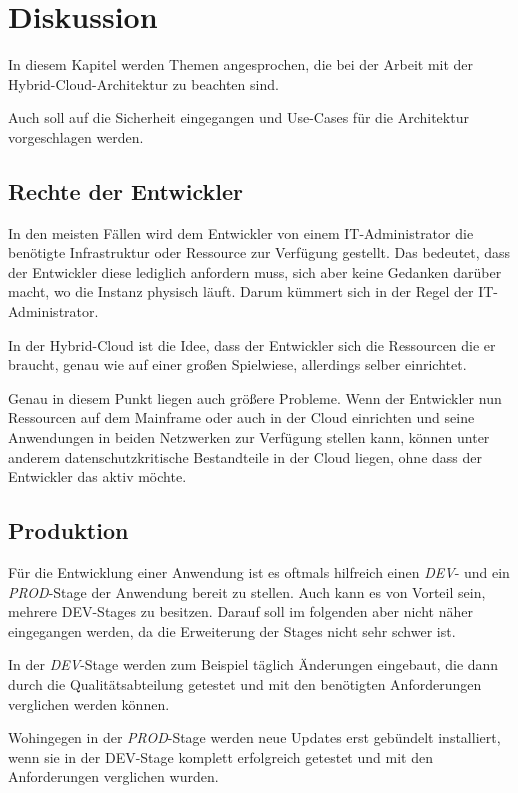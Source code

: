 \chapter{Diskussion}
\label{cha:diskussion}
In diesem Kapitel werden Themen angesprochen, die bei der Arbeit mit der Hybrid-Cloud-Architektur zu beachten sind.

Auch soll auf die Sicherheit eingegangen und Use-Cases für die Architektur vorgeschlagen werden.

\section{Rechte der Entwickler}
\label{sec:rechte_der_entwickler}
In den meisten Fällen wird dem Entwickler von einem IT-Administrator die benötigte Infrastruktur oder Ressource zur
Verfügung gestellt. Das bedeutet, dass der Entwickler diese lediglich anfordern muss, sich aber keine Gedanken darüber
macht, wo die Instanz physisch läuft. Darum kümmert sich in der Regel der IT-Administrator.

In der Hybrid-Cloud ist die Idee, dass der Entwickler sich die Ressourcen die er braucht, genau wie auf einer großen
Spielwiese, allerdings selber einrichtet.

Genau in diesem Punkt liegen auch größere Probleme. Wenn der Entwickler nun Ressourcen auf dem Mainframe oder auch in der
Cloud einrichten und seine Anwendungen in beiden Netzwerken zur Verfügung stellen kann, können unter anderem
datenschutzkritische Bestandteile in der Cloud liegen, ohne dass der Entwickler das aktiv möchte.

\section{Produktion}
Für die Entwicklung einer Anwendung ist es oftmals hilfreich einen \textit{DEV}- und ein \textit{PROD}-Stage der Anwendung
bereit zu stellen. Auch kann es von Vorteil sein, mehrere DEV-Stages zu besitzen. Darauf soll im folgenden aber nicht
näher eingegangen werden, da die Erweiterung der Stages nicht sehr schwer ist.

In der \textit{DEV}-Stage werden zum Beispiel täglich Änderungen eingebaut, die dann durch die Qualitätsabteilung
getestet und mit den benötigten Anforderungen verglichen werden können.

Wohingegen in der \textit{PROD}-Stage werden neue Updates erst gebündelt installiert, wenn sie in der DEV-Stage komplett
erfolgreich getestet und mit den Anforderungen verglichen wurden.

